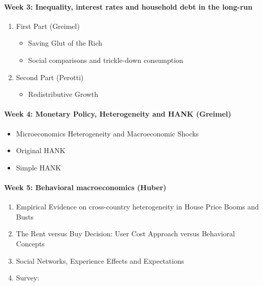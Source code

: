 \documentclass[a4paper,12pt]{article}
\begin{document}
\paragraph{Week 3: Inequality, interest rates and household debt in the long-run}

\begin{enumerate}
  \item First Part (Greimel)
  \begin{itemize}
  \item Saving Glut of the Rich  \citep{kumhof2015inequality,mian2021indebted-demand}
  \item Social comparisons and trickle-down consumption
    \citep{bertrand2016trickle, bellet2019mcmansion, drechsel2021falling-behind}
  \end{itemize}
  
\item Second Part (Perotti)
  \begin{itemize}
  \item Redistributive Growth \citep{doettling2020secular}
  \end{itemize}
\end{enumerate}

\paragraph{Week 4: Monetary Policy, Heterogeneity and HANK (Greimel)}
\begin{itemize}
\item Microeconomics Heterogeneity and Macroeconomic Shocks \citep{kaplan2018microeconomic}
\item Original HANK \citep{kaplan2018monetary}
\item Simple HANK \citep{bilbiie2018analytical}
\end{itemize}

\paragraph{Week 5: Behavioral macroeconomics (Huber)}
\begin{enumerate}
\item Empirical Evidence on cross-country heterogeneity in House Price Booms and Busts \citep{Huber:2019}
\item The Rent versus Buy Decision: User Cost Approach
  versus Behavioral Concepts
  \citep{Huber:2022,Huber:2020}
\item Social Networks, Experience Effects and Expectations 
  \citep{Kuchler:2019, bailey2018housing, Malmendier:2019, kaplan2020housing}
\item Survey: \citep{kuchler2022expectations}
\end{enumerate}
\end{document}
